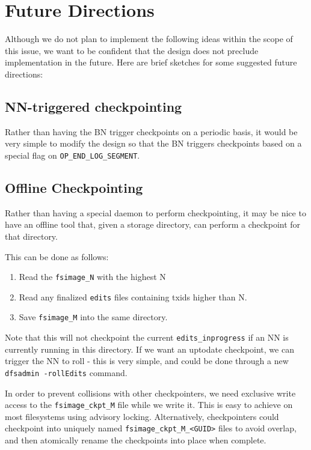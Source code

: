 \documentclass{article}
\begin{document}
\section{Future Directions}

Although we do not plan to implement the following ideas within the scope of this issue, we want to be confident that the design does not preclude implementation in the future. Here are brief sketches for some suggested future directions:

\subsection{NN-triggered checkpointing}

Rather than having the BN trigger checkpoints on a periodic basis, it would be very simple to modify the design so that the BN triggers checkpoints based on a special flag on {\tt OP\_END\_LOG\_SEGMENT}.

\subsection{Offline Checkpointing}

Rather than having a special daemon to perform checkpointing, it may be nice to have an offline tool that, given a storage directory, can perform a checkpoint for that directory.

This can be done as follows:
\begin{enumerate}
\item Read the {\tt fsimage\_N} with the highest N
\item Read any finalized {\tt edits} files containing txids higher than N.
\item Save {\tt fsimage\_M} into the same directory.
\end{enumerate}

Note that this will not checkpoint the current {\tt edits\_inprogress} if an NN is currently running in this directory. If we want an uptodate checkpoint, we can trigger the NN to roll - this is very simple, and could be done through a new {\tt dfsadmin -rollEdits} command.

In order to prevent collisions with other checkpointers, we need exclusive write access to the {\tt fsimage\_ckpt\_M} file while we write it. This is easy to achieve on most filesystems using advisory locking. Alternatively, checkpointers could checkpoint into uniquely named {\tt fsimage\_ckpt\_M\_<GUID>} files to avoid overlap, and then atomically rename the checkpoints into place when complete.
\end{document}
